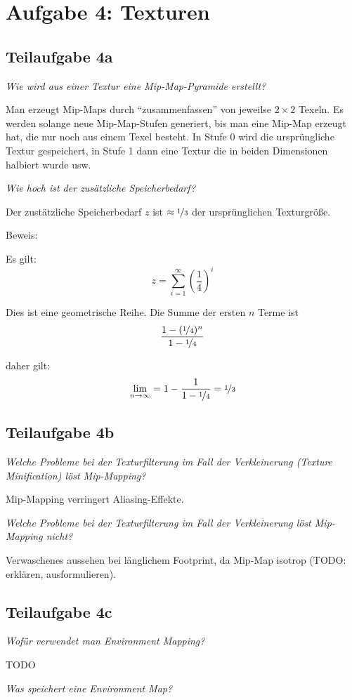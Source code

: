 \documentclass[a4paper]{scrartcl}
\begin{document}
\section*{Aufgabe 4: Texturen}
\subsection*{Teilaufgabe 4a}
\textit{Wie wird aus einer Textur eine Mip-Map-Pyramide erstellt?}

Man erzeugt Mip-Maps durch \enquote{zusammenfassen} von jeweilse $2 \times 2$
Texeln. Es werden solange neue Mip-Map-Stufen generiert, bis man eine Mip-Map
erzeugt hat, die nur noch aus einem Texel besteht. In Stufe 0 wird die
ursprüngliche Textur gespeichert, in Stufe 1 dann eine Textur die in beiden
Dimensionen halbiert wurde usw.

\textit{Wie hoch ist der zusätzliche Speicherbedarf?}

Der zustätzliche Speicherbedarf $z$ ist $\approx \nicefrac{1}{3}$ der ursprünglichen
Texturgröße.

Beweis:

Es gilt:
\[z = \sum_{i=1}^\infty \left (\frac{1}{4} \right )^i\]

Dies ist eine geometrische Reihe. Die Summe der ersten $n$ Terme ist
\[\frac{1- (\nicefrac{1}{4})^n}{1 - \nicefrac{1}{4}}\]

daher gilt:
\[\lim_{n \rightarrow \infty} = 1 - \frac{1}{1 - \nicefrac{1}{4}} = \nicefrac{1}{3}\]

\subsection*{Teilaufgabe 4b}
\textit{Welche Probleme bei der Texturfilterung im Fall der Verkleinerung (Texture Minification) löst Mip-Mapping?}

Mip-Mapping verringert Aliasing-Effekte.

\textit{Welche Probleme bei der Texturfilterung im Fall der Verkleinerung löst Mip-Mapping nicht?}

Verwaschenes aussehen bei länglichem Footprint, da Mip-Map isotrop (TODO: erklären, ausformulieren).

\subsection*{Teilaufgabe 4c}
\textit{Wofür verwendet man Environment Mapping?}

TODO

\textit{Was speichert eine Environment Map?}
\end{document}
